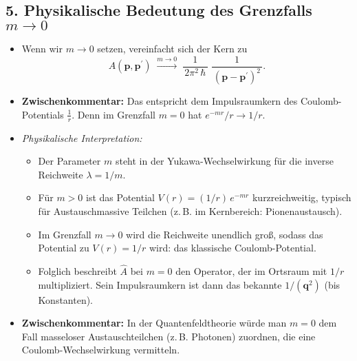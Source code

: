 \documentclass{scrartcl}
\begin{document}
\subsection*{5. Physikalische Bedeutung des Grenzfalls $m \to 0$}
\begin{itemize}
  \item Wenn wir $m \to 0$ setzen, vereinfacht sich der Kern zu
  \[
    A(\boldsymbol{p},\boldsymbol{p}^{\prime}) \;\xrightarrow{m\to 0}\;
    \frac{1}{\,2\pi^{2}\,\hbar\,}\;
    \frac{1}{\,(\boldsymbol{p} - \boldsymbol{p}^{\prime})^{2}\,}.
  \]
  \item \textbf{Zwischenkommentar:} 
    Das entspricht dem Impulsraumkern des Coulomb-Potentials $\frac{1}{r}$. Denn im Grenzfall $m=0$ hat $e^{-m r}/r \to 1/r$.
  \item \emph{Physikalische Interpretation:} 
  \begin{itemize}
    \item Der Parameter $m$ steht in der Yukawa-Wechselwirkung für die inverse Reichweite $\lambda = 1/m$. 
    \item Für $m>0$ ist das Potential $V(r) = (1/r)\,e^{-m r}$ kurzreichweitig, typisch für Austauschmassive Teilchen (z.\,B. im Kernbereich: Pionenaustausch).
    \item Im Grenzfall $m \to 0$ wird die Reichweite unendlich groß, sodass das Potential zu $V(r) = 1/r$ wird: das klassische Coulomb-Potential. 
    \item Folglich beschreibt $\hat{A}$ bei $m=0$ den Operator, der im Ortsraum mit $1/r$ multipliziert. Sein Impulsraumkern ist dann das bekannte $1/(\boldsymbol{q}^{2})$ (bis Konstanten).
  \end{itemize}
  \item \textbf{Zwischenkommentar:} 
    In der Quantenfeldtheorie würde man $m=0$ dem Fall masseloser Austauschteilchen (z.\,B. Photonen) zuordnen, die eine Coulomb-Wechselwirkung vermitteln.
\end{itemize}
\end{document}
